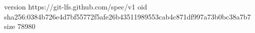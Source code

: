 version https://git-lfs.github.com/spec/v1
oid sha256:0384b726e4d7bf55772f5afe26b43511989553cab4c871df997a73b0bc38a7b7
size 78980
